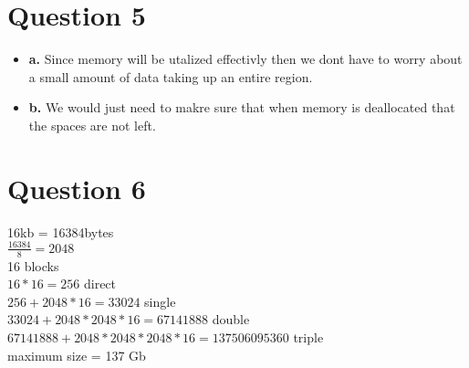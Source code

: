 \documentclass[11pt]{article}
\begin{document}
\section*{Question 5}
\begin{itemize}
    \item \textbf{a.}
        Since memory will be utalized effectivly then we 
        dont have to worry about a small amount of data taking
        up an entire region. 
    \item \textbf{b.}
        We would just need to makre sure that when memory
        is deallocated that the spaces are not left. 
\end{itemize}

\section*{Question 6}
    16kb = 16384bytes\\
    $\frac{16384}{8}=2048$\\
    16 blocks\\
    $16*16 = 256$ direct\\
    $256 + 2048*16 = 33024$ single\\
    $33024 + 2048*2048*16 = 67141888$ double\\
    $67141888 + 2048*2048*2048*16 = 137506095360$ triple\\
    maximum size = 137 Gb
\end{document}
